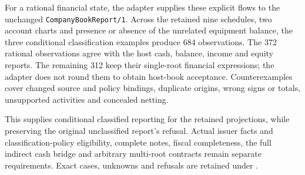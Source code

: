 For a rational financial state, the adapter supplies these explicit flows to
the unchanged \texttt{CompanyBookReport/1}. Across the retained nine schedules,
two account charts and presence or absence of the unrelated equipment balance,
the three conditional classification examples produce 684 observations.
The 372 rational observations agree with the host cash, balance, income and
equity reports. The remaining 312 keep their single-root financial expressions;
the adapter does not round them to obtain host-book acceptance. Counterexamples
cover changed source and policy bindings, duplicate origins, wrong signs or
totals, unsupported activities and concealed netting.

This supplies conditional classified reporting for the retained projections,
while preserving the original unclassified report's refusal. Actual issuer
facts and classification-policy eligibility, complete notes, fiscal completeness,
the full indirect cash bridge and arbitrary multi-root contracts remain separate
requirements. Exact cases, unknowns and refusals are retained under
{\small{}}.

